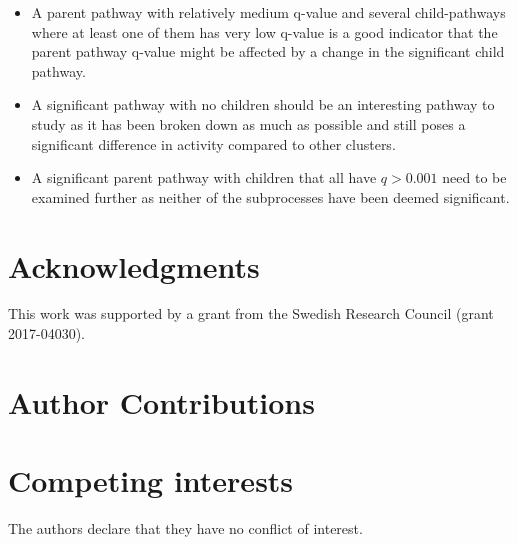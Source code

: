 \documentclass[11pt]{article}
\begin{document}
  \begin{itemize}
      \item A parent pathway with relatively medium q-value and several child-pathways where at least one of them has very low q-value is a good indicator that the parent pathway q-value might be affected by a change in the significant child pathway.
      \item A significant pathway with no children should be an interesting pathway to study as it has been broken down as much as possible and still poses a significant difference in activity compared to other clusters.
      \item A significant parent pathway with children that all have $q > 0.001 $ need to be examined further as neither of the subprocesses have been deemed significant.
    \end{itemize}

\section*{Acknowledgments}

This work was supported by a grant from the Swedish Research Council (grant
2017-04030).

\section*{Author Contributions}

\section*{Competing interests}

The authors declare that they have no conflict of interest.

\printbibliography[title=References]
\end{document}
